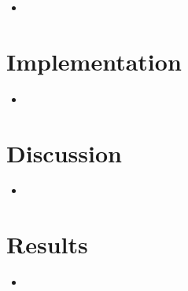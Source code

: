 \begin{itemize}
    \item
\end{itemize}

\section*{Implementation}

\begin{itemize}
    \item
\end{itemize}

\section*{Discussion}

\begin{itemize}
    \item
\end{itemize}

\section*{Results}

\begin{itemize}
    \item
\end{itemize}
